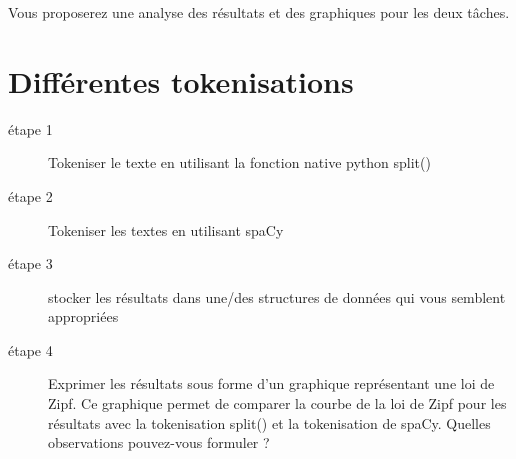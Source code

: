  Vous proposerez une analyse des résultats et des graphiques pour les deux tâches.
\vspace{0.5cm}
\section{Différentes tokenisations}
\vspace{0.5cm}

\begin{description}
\item [étape 1] Tokeniser le texte en utilisant la fonction native python split()
  \item [étape 2] Tokeniser les textes en utilisant spaCy
 \item [étape 3] stocker les résultats dans une/des structures de données qui vous semblent appropriées
 \item [étape 4] Exprimer les résultats sous forme d'un graphique représentant une loi de Zipf. Ce graphique permet de comparer la courbe de la loi de Zipf pour les résultats avec la tokenisation split() et la tokenisation de spaCy. Quelles observations pouvez-vous formuler ?
\end{description}



\vspace{0.5cm}

%
%
%
%
%  
    
   

\begin{center}

\noindent{}
	\end{center}
